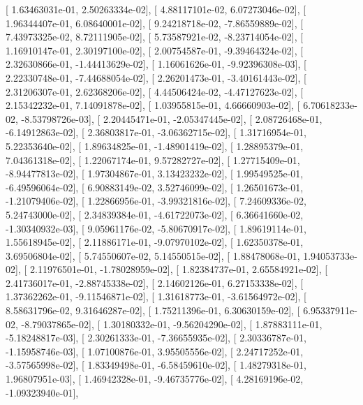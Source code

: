 \documentclass{article}
\begin{document}
       [  1.63463031e-01,   2.50263334e-02],
       [  4.88117101e-02,   6.07273046e-02],
       [  1.96344407e-01,   6.08640001e-02],
       [  9.24218718e-02,  -7.86559889e-02],
       [  7.43973325e-02,   8.72111905e-02],
       [  5.73587921e-02,  -8.23714054e-02],
       [  1.16910147e-01,   2.30197100e-02],
       [  2.00754587e-01,  -9.39464324e-02],
       [  2.32630866e-01,  -1.44413629e-02],
       [  1.16061626e-01,  -9.92396308e-03],
       [  2.22330748e-01,  -7.44688054e-02],
       [  2.26201473e-01,  -3.40161443e-02],
       [  2.31206307e-01,   2.62368206e-02],
       [  4.44506424e-02,  -4.47127623e-02],
       [  2.15342232e-01,   7.14091878e-02],
       [  1.03955815e-01,   4.66660903e-02],
       [  6.70618233e-02,  -8.53798726e-03],
       [  2.20445471e-01,  -2.05347445e-02],
       [  2.08726468e-01,  -6.14912863e-02],
       [  2.36803817e-01,  -3.06362715e-02],
       [  1.31716954e-01,   5.22353640e-02],
       [  1.89634825e-01,  -1.48901419e-02],
       [  1.28895379e-01,   7.04361318e-02],
       [  1.22067174e-01,   9.57282727e-02],
       [  1.27715409e-01,  -8.94477813e-02],
       [  1.97304867e-01,   3.13423232e-02],
       [  1.99549525e-01,  -6.49596064e-02],
       [  6.90883149e-02,   3.52746099e-02],
       [  1.26501673e-01,  -1.21079406e-02],
       [  1.22866956e-01,  -3.99321816e-02],
       [  7.24609336e-02,   5.24743000e-02],
       [  2.34839384e-01,  -4.61722073e-02],
       [  6.36641660e-02,  -1.30340932e-03],
       [  9.05961176e-02,  -5.80670917e-02],
       [  1.89619114e-01,   1.55618945e-02],
       [  2.11886171e-01,  -9.07970102e-02],
       [  1.62350378e-01,   3.69506804e-02],
       [  5.74550607e-02,   5.14550515e-02],
       [  1.88478068e-01,   1.94053733e-02],
       [  2.11976501e-01,  -1.78028959e-02],
       [  1.82384737e-01,   2.65584921e-02],
       [  2.41736017e-01,  -2.88745338e-02],
       [  2.14602126e-01,   6.27153338e-02],
       [  1.37362262e-01,  -9.11546871e-02],
       [  1.31618773e-01,  -3.61564972e-02],
       [  8.58631796e-02,   9.31646287e-02],
       [  1.75211396e-01,   6.30630159e-02],
       [  6.95337911e-02,  -8.79037865e-02],
       [  1.30180332e-01,  -9.56204290e-02],
       [  1.87883111e-01,  -5.18248817e-03],
       [  2.30261333e-01,  -7.36655935e-02],
       [  2.30336787e-01,  -1.15958746e-03],
       [  1.07100876e-01,   3.95505556e-02],
       [  2.24717252e-01,  -3.57565998e-02],
       [  1.83349498e-01,  -6.58459610e-02],
       [  1.48279318e-01,   1.96807951e-03],
       [  1.46942328e-01,  -9.46735776e-02],
       [  4.28169196e-02,  -1.09323940e-01],
\end{document}
